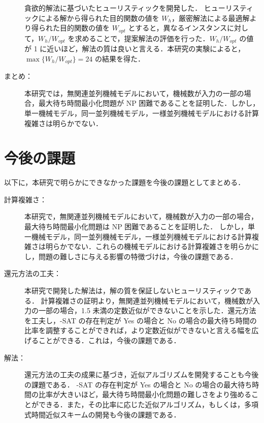 \documentclass[12pt]{optlab-bachelor}
\renewcommand{\bibname}{参考文献}
\begin{document}
\begin{description}
  貪欲的解法に基づいたヒューリスティックを開発した．
  ヒューリスティックによる解から得られた目的関数の値を $W_h$，厳密解法による最適解より得られた目的関数の値を $W_{opt}$ とすると，異なるインスタンスに対して，$W_h/W_{opt}$ を求めることで，提案解法の評価を行った．$W_h/W_{opt}$ の値が 1 に近いほど，解法の質は良いと言える．本研究の実験によると，$\max\big\{W_h/W_{opt}\big\} = 24$ の結果を得た．

  \item[まとめ：] 本研究では，無関連並列機械モデルにおいて，機械数が入力の一部の場合，最大待ち時間最小化問題が NP 困難であることを証明した．しかし，単一機械モデル，同一並列機械モデル，一様並列機械モデルにおける計算複雑さは明らかでない．
\end{description}

\section{今後の課題}
以下に，本研究で明らかにできなかった課題を今後の課題としてまとめる．
\begin{description}
  \item[計算複雑さ：] 本研究で，無関連並列機械モデルにおいて，機械数が入力の一部の場合，最大待ち時間最小化問題は NP 困難であることを証明した．
  しかし，単一機械モデル，同一並列機械モデル，一様並列機械モデルにおける計算複雑さは明らかでない．これらの機械モデルにおける計算複雑さを明らかにし，問題の難しさに与える影響の特徴づけは，今後の課題である．

  \item[還元方法の工夫：] 本研究で開発した解法は，解の質を保証しないヒューリスティックである．
  計算複雑さの証明より，無関連並列機械モデルにおいて，機械数が入力の一部の場合，1.5 未満の定数近似ができないことを示した．還元方法を工夫し，{-SAT} の存在判定が Yes の場合と No の場合の最大待ち時間の比率を調整することができれば，より定数近似ができないと言える幅を広げることができる．これは，今後の課題である．

  \item[解法：]
  還元方法の工夫の成果に基づき，近似アルゴリズムを開発することも今後の課題である．
  {-SAT} の存在判定が Yes の場合と No の場合の最大待ち時間の比率が大きいほど，最大待ち時間最小化問題の難しさをより強めることができる．また，その比率に応じた近似アルゴリズム，もしくは，多項式時間近似スキームの開発も今後の課題である．

\end{description}
\addcontentsline{toc}{chapter}{\bibname}


\end{document}
